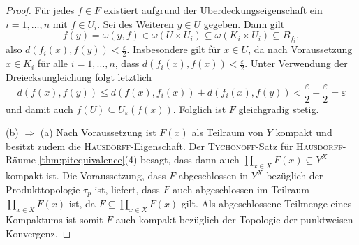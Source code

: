\begin{proof}
  Für jedes $f \in F$ existiert aufgrund der Überdeckungseigenschaft ein $i = 1,\dots,n$ mit $f \in U_i$.
  Sei des Weiteren $y \in U$ gegeben.
  Dann gilt
  \begin{displaymath}
    f(y) = \omega(y,f) \in \omega(U \times U_i) \subseteq \omega(K_i \times U_i) \subseteq B_{f_i},
  \end{displaymath}
  also $d(f_i(x),f(y)) < \tfrac{\varepsilon}{2}$.
  Insbesondere gilt für $x \in U$, da nach Voraussetzung $x \in K_i$ für alle $i = 1,\dots,n$, dass $d(f_i(x),f(x)) < \tfrac{\varepsilon}{2}$.
  Unter Verwendung der Dreiecksungleichung folgt letztlich
  \begin{displaymath}
    d(f(x),f(y)) \leq d(f(x),f_i(x)) + d(f_i(x),f(y)) < \frac{\varepsilon}{2} + \frac{\varepsilon}{2} = \varepsilon
  \end{displaymath}
  und damit auch $f(U) \subseteq U_\varepsilon(f(x))$.
  Folglich ist $F$ gleichgradig stetig.

  (b) $\Rightarrow$ (a)
  Nach Voraussetzung ist $F(x)$ als Teilraum von $Y$ kompakt und besitzt zudem die \textsc{Hausdorff}-Eigenschaft.
  Der \textsc{Tychonoff}-Satz für \textsc{Hausdorff}-Räume \ref{thm:pitequivalence}(4) besagt, dass dann auch $\prod_{x \in X} F(x) \subseteq Y^X$ kompakt ist.
  Die Voraussetzung, dass $F$ abgeschlossen in $Y^X$ bezüglich der Produkttopologie $\tau_p$ ist, liefert, dass $F$ auch abgeschlossen im Teilraum $\prod_{x \in X} F(x)$ ist, da $F \subseteq \prod_{x \in X} F(x)$ gilt.
  Als abgeschlossene Teilmenge eines Kompaktums ist somit $F$ auch kompakt bezüglich der Topologie der punktweisen Konvergenz.


\end{proof}
